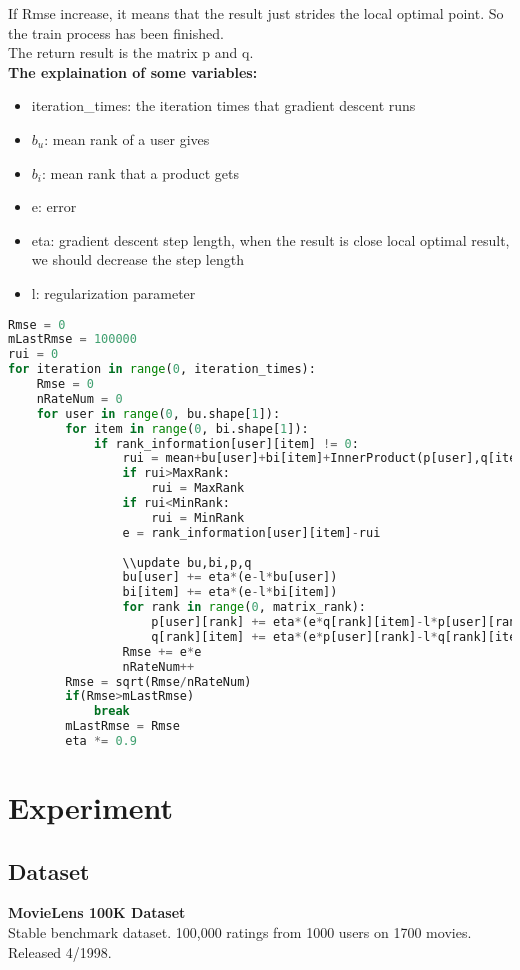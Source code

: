 \documentclass[]{article}
\begin{document}
If Rmse increase, it means that the result just strides the local optimal point. So the train process has been finished.\\


The return result is the matrix p and q.\\


\textbf{The explaination of some variables:} 
\begin{itemize}
	
	\item iteration\_times: the iteration times that gradient descent runs
	\item $b_u$: mean rank of a user gives
	\item $b_i$: mean rank that a product gets
	\item e: error
	\item eta: gradient descent step length, when the result is close local optimal result, we should decrease the step length 
	\item l: regularization parameter
\end{itemize}


\begin{lstlisting}[language=Python,title={RSVD}]  
Rmse = 0
mLastRmse = 100000
rui = 0
for iteration in range(0, iteration_times):
	Rmse = 0
	nRateNum = 0
	for user in range(0, bu.shape[1]):
		for item in range(0, bi.shape[1]):
			if rank_information[user][item] != 0:
				rui = mean+bu[user]+bi[item]+InnerProduct(p[user],q[item])
				if rui>MaxRank:
					rui = MaxRank
				if rui<MinRank:
					rui = MinRank
				e = rank_information[user][item]-rui
				
				\\update bu,bi,p,q
				bu[user] += eta*(e-l*bu[user])
				bi[item] += eta*(e-l*bi[item])
				for rank in range(0, matrix_rank):
					p[user][rank] += eta*(e*q[rank][item]-l*p[user][rank])
					q[rank][item] += eta*(e*p[user][rank]-l*q[rank][item])
				Rmse += e*e
				nRateNum++
		Rmse = sqrt(Rmse/nRateNum)
		if(Rmse>mLastRmse)
			break
		mLastRmse = Rmse
		eta *= 0.9			
\end{lstlisting} 
\section{Experiment}
\subsection{Dataset}
\textbf{MovieLens 100K Dataset}\\
Stable benchmark dataset. 100,000 ratings from 1000 users on 1700 movies. Released 4/1998.
\end{document}
